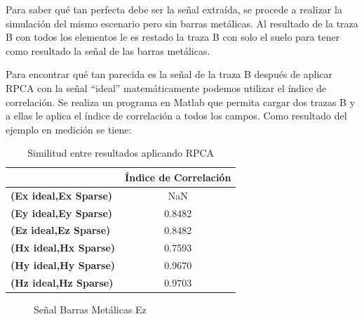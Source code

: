Para saber qué tan perfecta debe ser la señal extraída, se procede a realizar la simulación del mismo escenario pero sin barras metálicas. Al resultado de la traza B con todos los elementos le es restado la traza B con solo el suelo para tener como resultado la señal de las barras metálicas.

Para encontrar qué tan parecida es la señal de la traza B después de aplicar RPCA con la señal ``ideal''   matemáticamente podemos utilizar el índice de correlación.  Se realiza un programa en Matlab que permita cargar dos trazas B y a ellas le aplica el índice de correlación a todos los campos. Como resultado del ejemplo en medición se tiene:


\begin{table}[H]
\begin{center}
\caption{Similitud entre resultados aplicando RPCA} \label{tab:corrcoef1}
\begin{tabular}{l|c}
 & \multicolumn{1}{l}{\textbf{Índice de Correlación}} \\ \hline
\textbf{(Ex ideal,Ex Sparse)} & NaN \\
\textbf{(Ey ideal,Ey Sparse)} & 0.8482 \\
\textbf{(Ez ideal,Ez Sparse)} & 0.8482 \\
\textbf{(Hx ideal,Hx Sparse)} & 0.7593 \\
\textbf{(Hy ideal,Hy Sparse)} & 0.9670 \\
\textbf{(Hz ideal,Hz Sparse)} & 0.9703
\end{tabular}
\end{center}
\end{table} 

\begin{figure}[H]  
\centering
{}

\caption{Señal Barras Metálicas Ez}
\label{fig:barraMetalIdeal}


\end{figure}


